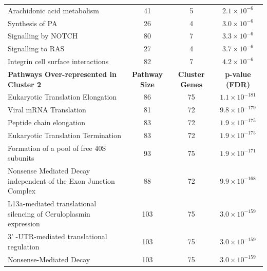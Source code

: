 \begin{table}[!hp]
{\begin{threeparttable}
\begin{tabular}{lccc}
  \rowcolor{Cluster_Blue!15} 
  Arachidonic acid metabolism &  41 &   5 & $2.1 \times 10^{-6}$ \\
  \rowcolor{Cluster_Blue!20} 
  Synthesis of PA &  26 &   4 & $3.0 \times 10^{-6}$ \\
  \rowcolor{Cluster_Blue!15} 
  Signalling by NOTCH &  80 &   7 & $3.3 \times 10^{-6}$ \\
  \rowcolor{Cluster_Blue!20} 
  Signalling to RAS &  27 &   4 & $3.7 \times 10^{-6}$ \\
  \rowcolor{Cluster_Blue!15} 
  Integrin cell surface interactions &  82 &   7 & $4.2 \times 10^{-6}$ \\
  \hline
  \cellcolor{white} \large{\textbf{Pathways Over-represented in Cluster 2}} & \large{\textbf{Pathway Size}} & \large{\textbf{Cluster Genes}} & \large{\textbf{p-value (FDR)}} \\ %
  \hline
  \rowcolor{Cluster_Green!20}
  Eukaryotic Translation Elongation &  86 &  75 & $1.1 \times 10^{-181}$ \\
  \rowcolor{Cluster_Green!15} 
  Viral mRNA Translation &  81 &  72 & $9.8 \times 10^{-179}$ \\
  \rowcolor{Cluster_Green!20} 
  Peptide chain elongation &  83 &  72 & $1.9 \times 10^{-175}$ \\
  \rowcolor{Cluster_Green!15} 
  Eukaryotic Translation Termination &  83 &  72 & $1.9 \times 10^{-175}$ \\
  \rowcolor{Cluster_Green!20} 
  Formation of a pool of free 40S subunits &  93 &  75 & $1.9 \times 10^{-171}$ \\
  \rowcolor{Cluster_Green!15} 
  Nonsense Mediated Decay independent of the Exon Junction Complex &  88 &  72 & $9.9 \times 10^{-168}$ \\
  \rowcolor{Cluster_Green!20} 
  L13a-mediated translational silencing of Ceruloplasmin expression & 103 &  75 & $3.0 \times 10^{-159}$ \\
  \rowcolor{Cluster_Green!15} 
  3' -UTR-mediated translational regulation & 103 &  75 & $3.0 \times 10^{-159}$ \\
  \rowcolor{Cluster_Green!20} 
  Nonsense-Mediated Decay & 103 &  75 & $3.0 \times 10^{-159}$ \\

\end{tabular}
\end{threeparttable}}
\end{table}

